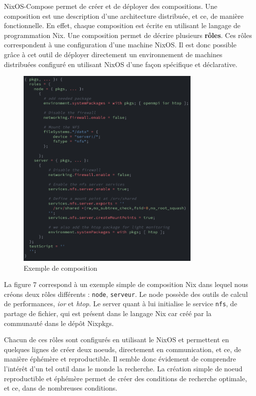 \documentclass[a4paper,french,12pt, titlepage]{article}
\begin{document}
NixOS-Compose permet de créer et de déployer des compositions. Une
composition est une description d'une architecture distribuée, et ce, de
manière fonctionnelle. En effet, chaque composition est écrite en
utilisant le langage de programmation Nix. Une composition permet de
décrire plusieurs \textbf{rôles}. Ces rôles correspondent à une
configuration d'une machine NixOS. Il est donc possible grâce à cet
outil de déployer directement un environnement de machines distribuées
configuré en utilisant NixOS d'une façon spécifique et
déclarative.\newline

\begin{figure}[h]
\centering
\includegraphics[width=0.8\textwidth,height=0.8\textheight,keepaspectratio]{images/coposition-nfs.png}
\caption{Exemple de composition}
\end{figure}

La figure 7 correspond à un exemple simple de composition Nix dans
lequel nous créons deux rôles différents : \texttt{node},
\texttt{serveur}. Le node possède des outils de calcul de performances,
\emph{ior} et \emph{htop}. Le server quant à lui initialise le service
\texttt{nfs}, de partage de fichier, qui est présent dans le langage Nix
car créé par la communauté dans le dépôt Nixpkgs.\newline

Chacun de ces rôles sont configurés en utilisant le NixOS et permettent
en quelques lignes de créer deux noeuds, directement en communication,
et ce, de manière éphémère et reproductible. Il semble donc évidement de
comprendre l'intérêt d'un tel outil dans le monde la recherche. La
création simple de noeud reproductible et éphémère permet de créer des
conditions de recherche optimale, et ce, dans de nombreuses
conditions.\newline
\end{document}
